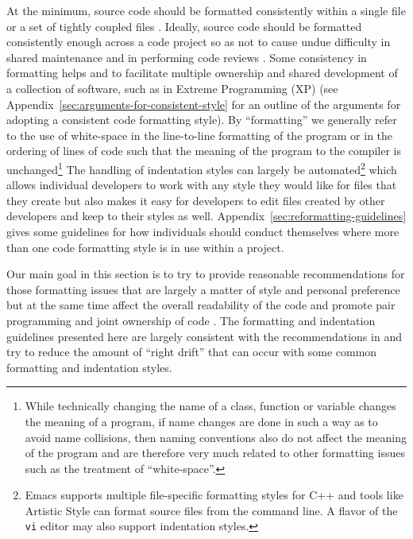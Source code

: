 At the minimum, source code should be formatted consistently within a single
file or a set of tightly coupled files {}\cite[Item 0]{C++CodingStandards05}.
Ideally, source code should be formatted consistently enough across a code
project so as not to cause undue difficulty in shared maintenance and in
performing code reviews {}\cite{CodeComplete2nd04}.  Some consistency in
formatting helps and to facilitate multiple ownership and shared development
of a collection of software, such as in Extreme Programming (XP)
{}\cite{ExtremeProgrammingExplained99} (see
Appendix~\ref{sec:arguments-for-consistent-style} for an outline of the
arguments for adopting a consistent code formatting style).  By ``formatting''
we generally refer to the use of white-space in the line-to-line formatting of
the program or in the ordering of lines of code such that the meaning of the
program to the compiler is unchanged\footnote{While technically changing the
name of a class, function or variable changes the meaning of a program, if
name changes are done in such a way as to avoid name collisions, then naming
conventions also do not affect the meaning of the program and are therefore
very much related to other formatting issues such as the treatment of
``white-space''.}  The handling of indentation styles can largely be
automated\footnote{Emacs supports multiple file-specific formatting styles for
C++ and tools like Artistic Style {}\cite{ArtisticStyle} can format source
files from the command line.  A flavor of the {}\texttt{vi} editor may also
support indentation styles. } which allows individual developers to work with
any style they would like for files that they create but also makes it easy
for developers to edit files created by other developers and keep to their
styles as well.  Appendix~\ref{sec:reformatting-guidelines} gives some
guidelines for how individuals should conduct themselves where more than one
code formatting style is in use within a project.

Our main goal in this section is to try to provide reasonable recommendations
for those formatting issues that are largely a matter of style and personal
preference but at the same time affect the overall readability of the code and
promote pair programming and joint ownership of code
{}\cite{ExtremeProgrammingExplained99}.  The formatting and indentation
guidelines presented here are largely consistent with the recommendations in
{}\cite[Chapter 31]{CodeComplete2nd04} and try to reduce the amount of ``right
drift'' that can occur with some common formatting and indentation styles.

